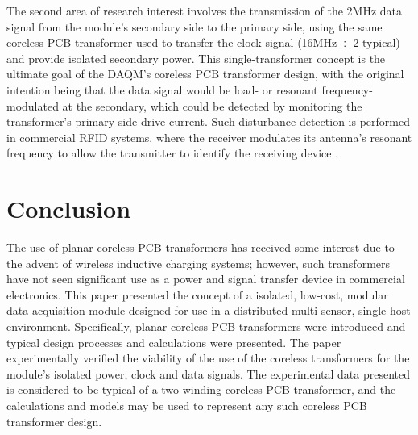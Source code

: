 \documentclass[conference]{IEEEtran}
\begin{document}
The second area of research interest involves the transmission of the 2MHz data signal from the module's secondary side to the primary side, using the same coreless PCB transformer used to transfer the clock signal (16MHz $ \div $ 2 typical) and provide isolated secondary power.  This single-transformer concept is the ultimate goal of the DAQM's coreless PCB transformer design, with the original intention being that the data signal would be load- or resonant frequency-modulated at the secondary, which could be detected by monitoring the transformer's primary-side drive current.  Such disturbance detection is performed in commercial RFID systems, where the receiver modulates its antenna's resonant frequency to allow the transmitter to identify the receiving device \cite{RFID}.

\section{Conclusion}
The use of planar coreless PCB transformers has received some interest due to the advent of wireless inductive charging systems; however, such transformers have not seen significant use as a power and signal transfer device in commercial electronics.  This paper presented the concept of a isolated, low-cost, modular data acquisition module designed for use in a distributed multi-sensor, single-host environment.  Specifically, planar coreless PCB transformers were introduced and typical design processes and calculations were presented.  The paper experimentally verified the viability of the use of the coreless transformers for the module's isolated power, clock and data signals.  The experimental data presented is considered to be typical of a two-winding coreless PCB transformer, and the calculations and models may be used to represent any such coreless PCB transformer design.  







\end{document}
